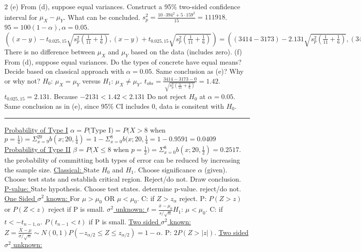 \documentclass[9pt]{article}
\newcommand*\mean[1]{\bar{#1}}
\begin{document}
\begin{multicols*}{2}
    (e) From (d), suppose equal variances. Construct a 95\% two-sided confidence interval for $\mu_X - \mu_Y$. What can be concluded.
    $s_p^2 = \frac{10\cdot 394^2+5\cdot 159^2}{15}=111918$. $95=100(1-\alpha), \alpha=0.05$. $((x-y) - t_{0.025,15}\sqrt{s_p^2(\frac{1}{11}+\frac{1}{6})}, (x-y) + t_{0.025,15}\sqrt{s_p^2(\frac{1}{11}+\frac{1}{6})}) = ((3414-3173) - 2.131\sqrt{s_p^2(\frac{1}{11}+\frac{1}{6})}, (3414-3173) + 2.131\sqrt{s_p^2(\frac{1}{11}+\frac{1}{6})}) = (-120.8, 602.8)$ There is no difference between $\mu_X$ and $\mu_Y$ based on the data (includes zero).\newline
    (f) From (d), suppose equal variances. Do the types of concrete have equal means? Decide based on classical approach with $\alpha=0.05$. Same conclusion as (e)? Why or why not?
    $H_0$: $\mu_X = \mu_Y$ versus $H_1$: $\mu_X\not= \mu_Y$. $t_{obs}=\frac{3414-3173-0}{\sqrt{s_p^2(\frac{1}{11} + \frac{1}{6})}} = 1.42$. $t_{0.025,15}=2.131$. Because $-2131 < 1.42 < 2.131$ Do not reject $H_0$ at $\alpha = 0.05$. Same conclusion as in (e), since 95\% CI includes 0, data is consitent with $H_0$.
    \rule{0.5\textwidth}{0.4pt}
    \uline{Probability of Type I} $\alpha = P($Type I$) = P(X > 8$ when $p=\frac{1}{4}) = \Sigma_{x=9}^{20}b(x;20,\frac{1}{4}) = 1 - \Sigma_{x=0}^{8}b(x;20,\frac{1}{4} = 1-0.9591 = 0.0409$\newline
    \uline{Probability of Type II} $\beta = P(X\leq 8 $ when $p=\frac{1}{2} ) = \Sigma_{x=0}^{8}b(x;20,\frac{1}{2}) = 0.2517$.
    the probability of committing both types of error can be reduced by
    increasing the sample size.
    \uline{Classical: } State $H_0$ and $H_1$. Choose significance $\alpha$ (given). Choose test stats and establish critical region. Reject/do not. Draw conclusion.
    \uline{P-value: } State hypothesis. Choose test states. determine p-value. reject/do not.\newline
    \uline{One Sided $\sigma^2$ known: } For $\mu > \mu_0$ OR $\mu < \mu_0$. C: if $Z > z_\alpha$ reject. P: $P(Z>z)$ or $P(Z<z)$ reject if P is small.
    \uline{$\sigma^2$ unknown: } $t= \frac{\mean{x}-\mu_0}{s/\sqrt{n}}$$H_1$: $\mu<\mu_0$. C: if $t<-t_{n-1,\alpha}$. $P(t_{n-1}<t)$ if P is small. 
    \uline{Two sided $\sigma^2$ known: } $Z=\frac{\mean{X}-\mu}{\sigma/\sqrt{n}}\sim N(0,1) P(-z_{\alpha/2} \leq Z \leq z_{\alpha/2}) = 1-\alpha$. P: $2P(Z> |z|)$. 
    \uline{Two sided $\sigma^2$ unknown: }
\end{multicols*}
\end{document}
